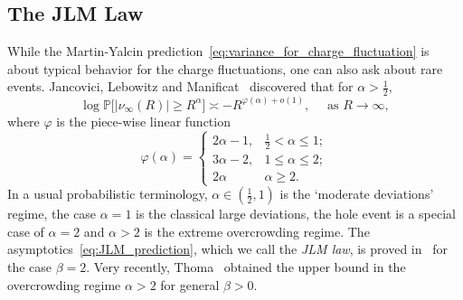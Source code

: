 \documentclass[11pt]{amsart}
\theoremstyle{definition}
\theoremstyle{remark}
\numberwithin{equation}{section}
\newcommand{\bP}{\mathbb P}
\begin{document}
	\subsection{The JLM Law}
	While the Martin-Yalcin prediction~\eqref{eq:variance_for_charge_fluctuation} is about typical behavior for the charge fluctuations, one can also ask about rare events. Jancovici, Lebowitz and Manificat~\cite{JLM} discovered that for $\alpha>\tfrac{1}{2}$,
	\begin{equation}
		\label{eq:JLM_prediction}
		\log \bP\Big[|\nu_\infty(R)| \ge R^\alpha\Big] \asymp -R^{\varphi(\alpha) + o(1)}, \quad \text{ as } R \to \infty,
	\end{equation}
	where $\varphi$ is the piece-wise linear function
	\begin{equation}
		\label{eq:def_of_phi_alpha}
		\varphi(\alpha) = \begin{cases}
			2\alpha - 1, & \frac{1}{2}<\alpha \le 1; \\ 3\alpha -2, & 1 \le \alpha \le 2; \\ 2\alpha & \alpha \ge 2.
		\end{cases}
	\end{equation}
	In a usual probabilistic terminology, $\alpha\in(\tfrac{1}{2},1)$ is the `moderate deviations' regime, the case $\alpha=1$ is the classical large deviations, the hole event is a special case of $\alpha=2$ and $\alpha>2$ is the extreme overcrowding regime. The asymptotics~\eqref{eq:JLM_prediction}, which we call the \emph{JLM law}, is proved in~\cite{FenzlLambert, JLM, Shirai} for the case $\beta=2$. Very recently, Thoma~\cite{Thoma} obtained the upper bound in the overcrowding regime $\alpha>2$ for general $\beta>0$. 
	
\end{document}
